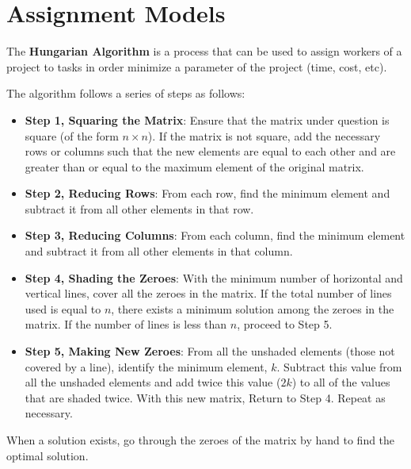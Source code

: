 %
%
%



\section{Assignment Models} \label{Module1:AsgnmtModels}

\begin{defn} \label{mod1:defn:HungAlg}
	The \textbf{Hungarian Algorithm} is a process that can be used to assign workers of a project to tasks in order minimize a parameter of the project (time, cost, etc).
\end{defn}


\begin{defn} \label{mod1:defn:HungAlgStep4}
	The algorithm follows a series of steps as follows:
	\begin{itemize}
		\item \textbf{Step 1, Squaring the Matrix}: Ensure that the matrix under question is square (of the form $n\times n$). If the matrix is not square, add the necessary rows or columns such that the new elements are equal to each other and are greater than or equal to the maximum element of the original matrix.
		\item \textbf{Step 2, Reducing Rows}: From each row, find the minimum element and subtract it from all other elements in that row.
		\item \textbf{Step 3, Reducing Columns}: From each column, find the minimum element and subtract it from all other elements in that column.
		\item \textbf{Step 4, Shading the Zeroes}: With the minimum number of horizontal and vertical lines, cover all the zeroes in the matrix. If the total number of lines used is equal to $n$, there exists a minimum solution among the zeroes in the matrix. If the number of lines is less than $n$, proceed to Step 5.
		\item \textbf{Step 5, Making New Zeroes}: From all the unshaded elements (those not covered by a line), identify the minimum element, $k$. Subtract this value from all the unshaded elements and add twice this value ($2k$) to all of the values that are shaded twice. With this new matrix, Return to Step 4. Repeat as necessary.
	\end{itemize}
When a solution exists, go through the zeroes of the matrix by hand to find the optimal solution.
\end{defn}

